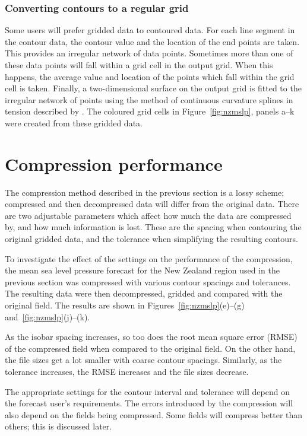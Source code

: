 \documentclass[12pt,a4paper]{article}
\begin{document}
\subsubsection*{Converting contours to a regular grid}
\label{sec:gridding}

Some users will prefer gridded data to contoured data. For each line segment in
the contour data, the contour value and the location of the end points are
taken. This provides an irregular network of data points. Sometimes more than
one of these data points will fall within a grid cell in the output grid. When
this happens, the average value and location of the points which fall within
the grid cell is taken. Finally, a two-dimensional surface on the output grid
is fitted to the irregular network of points using the method of continuous
curvature splines in tension described by \cite{smith_wessel1990}. The coloured
grid cells in Figure~\ref{fig:nzmslp}, panels a--k were created from these
gridded data.

\section*{Compression performance}
\label{sec:performance}

The compression method described in the previous section is a lossy scheme;
compressed and then decompressed data will differ from the original data. There
are two adjustable parameters which affect how much the data are compressed by,
and how much information is lost. These are the spacing when contouring the
original gridded data, and the tolerance when simplifying the resulting
contours.

To investigate the effect of the settings on the performance of the
compression, the mean sea level pressure forecast for the New Zealand region
used in the previous section was compressed with various contour spacings and
tolerances. The resulting data were then decompressed, gridded and compared
with the original field. The results are shown in
Figures~\ref{fig:nzmslp}(e)--(g) and~\ref{fig:nzmslp}(j)--(k).

As the isobar spacing increases, so too does the root mean square error (RMSE)
of the compressed field when compared to the original field. On the other hand,
the file sizes get a lot smaller with coarse contour spacings. Similarly, as
the tolerance increases, the RMSE increases and the file sizes decrease.

The appropriate settings for the contour interval and tolerance will depend on
the forecast user's requirements. The errors introduced by the compression will
also depend on the fields being compressed. Some fields will compress better
than others; this is discussed later.
\end{document}
